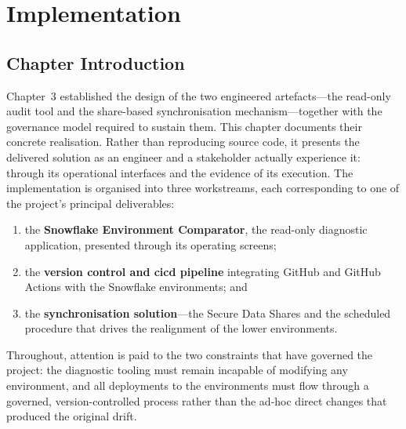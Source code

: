 %
\chapter{Implementation}
\label{chap:implementation}

\section*{Chapter Introduction}

Chapter~3 established the design of the two engineered artefacts---the read-only audit tool and the share-based synchronisation mechanism---together with the governance model required to sustain them. This chapter documents their concrete realisation. Rather than reproducing source code, it presents the delivered solution as an engineer and a stakeholder actually experience it: through its operational interfaces and the evidence of its execution. The implementation is organised into three workstreams, each corresponding to one of the project's principal deliverables:

\begin{enumerate}
  \item the \textbf{Snowflake Environment Comparator}, the read-only diagnostic application, presented through its operating screens;
  \item the \textbf{version control and \gls{cicd} pipeline} integrating GitHub and GitHub Actions with the Snowflake environments; and
  \item the \textbf{synchronisation solution}---the Secure Data Shares and the scheduled procedure that drives the realignment of the lower environments.
\end{enumerate}

Throughout, attention is paid to the two constraints that have governed the project: the diagnostic tooling must remain incapable of modifying any environment, and all deployments to the environments must flow through a governed, version-controlled process rather than the ad-hoc direct changes that produced the original drift.

